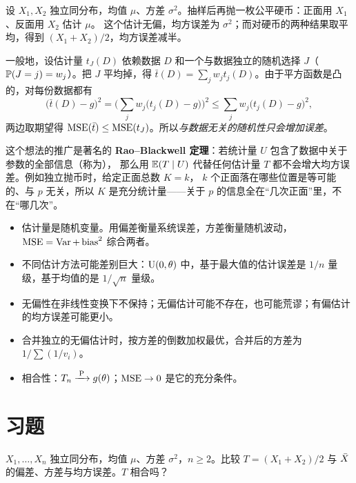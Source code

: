 \begin{deeper}[去掉人为的随机性只会更好]
设 $X_1,X_2$ 独立同分布，均值 $\mu$、方差 $\sigma^2$。抽样后再抛一枚公平硬币：正面用 $X_1$、反面用 $X_2$ 估计 $\mu$。
这个估计无偏，均方误差为 $\sigma^2$；而对硬币的两种结果取平均，得到 $(X_1+X_2)/2$，均方误差减半。

一般地，设估计量 $t_J(D)$ 依赖数据 $D$ 和一个与数据独立的随机选择 $J$（$\P(J=j)=w_j$）。把 $J$ 平均掉，得
$\bar t(D)=\sum_jw_jt_j(D)$。由于平方函数是凸的，对每份数据都有
\[
\big(\bar t(D)-g\big)^2=\Big(\sum_jw_j\big(t_j(D)-g\big)\Big)^2\le\sum_jw_j\big(t_j(D)-g\big)^2,
\]
两边取期望得 $\MSE(\bar t)\le\MSE(t_J)$。所以\emph{与数据无关的随机性只会增加误差}。

这个想法的推广是著名的 \textbf{Rao–Blackwell 定理}：若统计量 $U$ 包含了数据中关于参数的全部信息（称为），
那么用 $\E(T\mid U)$ 代替任何估计量 $T$ 都不会增大均方误差。例如独立抛币时，给定正面总数 $K=k$，
$k$ 个正面落在哪些位置是等可能的、与 $p$ 无关，所以 $K$ 是充分统计量——关于 $p$ 的信息全在“几次正面”里，不在“哪几次”。
\end{deeper}

\begin{summary}
\begin{itemize}
\item 估计量是随机变量。用偏差衡量系统误差，方差衡量随机波动，$\MSE=\Var+\bias^2$ 综合两者。
\item 不同估计方法可能差别巨大：$\Unif(0,\theta)$ 中，基于最大值的估计误差是 $1/n$ 量级，基于均值的是 $1/\sqrt n$ 量级。
\item 无偏性在非线性变换下不保持；无偏估计可能不存在，也可能荒谬；有偏估计的均方误差可能更小。
\item 合并独立的无偏估计时，按方差的倒数加权最优，合并后的方差为 $1/\sum(1/v_i)$。
\item 相合性：$T_n\toP g(\theta)$；$\MSE\to0$ 是它的充分条件。
\end{itemize}
\end{summary}

\section*{习题}

\levelA
\begin{exercise}
$X_1,\dots,X_n$ 独立同分布，均值 $\mu$、方差 $\sigma^2$，$n\ge2$。比较 $T=(X_1+X_2)/2$ 与 $\Xbar$ 的偏差、方差与均方误差。$T$ 相合吗？
\end{exercise}

